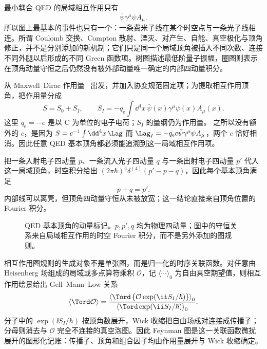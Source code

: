 
最小耦合 QED 的局域相互作用只有
\[
\bar\psi\gamma^\mu\psi A_\mu .
\]
所以图上最基本的事件也只有一个：一条费米子线在某个时空点与一条光子线相连。所谓 Coulomb 交换、Compton 散射、湮灭、对产生、自能、真空极化与顶角修正，并不是分别添加的新机制；它们只是同一个局域顶角被插入不同次数、连接不同外腿以后形成的不同 Green 函数项。树图描述最低阶量子振幅，圈图则表示在顶角动量守恒之后仍然没有被外部动量唯一确定的内部四动量积分。


从 Maxwell--Dirac 作用量~ 出发，并加入协变规范固定项；为提取相互作用顶角，把作用量分成
\begin{equation}
 S=S_0+S_I,
 \qquad
 S_I=-q_{\mathrm e}\int\dd^4 x\,
 \bar\psi(x)\gamma^\mu\psi(x)A_\mu(x).
 \label{eq:qed-S0-SI-dp7}
\end{equation}
这里 $q_{\mathrm e}=-e$ 是以 C 为单位的电子电荷；$S_I$ 的量纲仍为作用量。 之所以没有额外的 $c$，是因为
$S=c^{-1}\int\dd^4 x\,\Lag$ 而
$\Lag_I=-q_{\mathrm e} c\bar\psi\gamma^\mu\psi A_\mu$，两个 $c$ 恰好相消。因此任意 QED 基本顶角都必须能追溯到这一局域相互作用项。

把一条入射电子四动量 $p$、一条流入光子四动量 $q$ 与一条出射电子四动量 $p'$ 代入这一局域顶角，时空积分给出 $(2\pi\hbar)^4\delta^{(4)}(p'-p-q)$，因此每个基本顶角满足
\begin{equation}
 p+q=p'.
 \label{eq:qed-vertex-momentum-conservation-dp68}
\end{equation}
内部线可以离壳，但顶角四动量守恒从未被放宽；这一结论直接来自顶角位置的 Fourier 积分。

\begin{figure}[htbp]
 \centering
 
 \caption{QED 基本顶角的动量标记。$p,p',q$ 均为物理四动量；图中的守恒关系来自局域相互作用的时空 Fourier 积分，而不是另外添加的图规则。}
 \label{fig:qed-elementary-vertex-dp7}
\end{figure}

相互作用图规则的生成对象不是单张图，而是归一化的时序关联函数。对任意由 Heisenberg 场组成的局域或多点算符乘积 $\mathcal O$，记 $\langle\cdots\rangle_0$ 为自由真空期望值，则相互作用绘景给出 Gell--Mann--Low 关系
\begin{equation}
 {
 \langle\Tord\mathcal O\rangle
 =\frac{
 \left\langle\Tord\left\{\mathcal O
 \exp\!\left(\ii S_I/\hbar\right)\right\}\right\rangle_0}
 {\left\langle\Tord\exp\!\left(\ii S_I/\hbar\right)\right\rangle_0}.}
 \label{eq:qed-gell-mann-low-dp7}
\end{equation}
分子中的 $\exp(\ii S_I/\hbar)$ 按顶角数展开，Wick 收缩把自由场成对连接成传播子；分母则消去与 $\mathcal O$ 完全不连接的真空泡图。因此 Feynman 图是这一关联函数微扰展开的图形化记账：传播子、顶角和组合因子均由作用量展开与 Wick 收缩确定。

